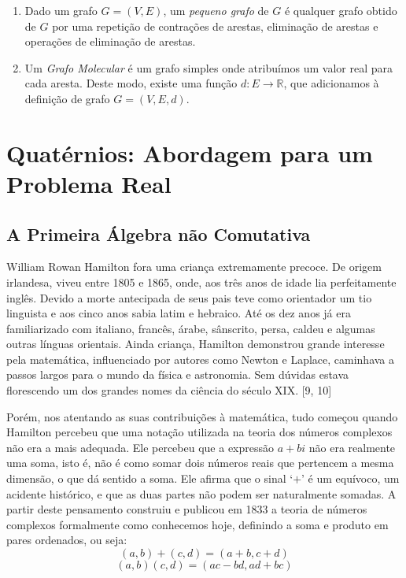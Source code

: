\documentclass[a4paper,12pt]{article}
\begin{document}
\begin{enumerate}
		\item Dado um grafo $G=(V,E)$, um \textit{pequeno grafo} de $G$ é qualquer grafo obtido de $G$ por uma repetição de contrações de arestas, eliminação de arestas e operações de eliminação de arestas.
		\item Um \textit{Grafo Molecular} é um grafo simples onde atribuímos um valor real para cada aresta. Deste modo, existe uma função $d:E\rightarrow \mathbb{R}$, que adicionamos à definição de grafo $G=(V,E,d)$.
	\end{enumerate}
	\newpage
	
	\section{Quatérnios: Abordagem para um Problema Real}
	
	\subsection{A Primeira Álgebra não Comutativa}
	William Rowan Hamilton fora uma criança extremamente precoce. De origem irlandesa, viveu entre 1805 e 1865, onde, aos três anos de idade lia perfeitamente inglês. Devido a morte antecipada de seus pais teve como orientador um tio linguista e aos cinco anos sabia latim e hebraico. Até os dez anos já era familiarizado com italiano, francês, árabe, sânscrito, persa, caldeu e algumas outras línguas orientais. Ainda criança, Hamilton demonstrou grande interesse pela matemática, influenciado por autores como Newton e Laplace, caminhava a passos largos para o mundo da física e astronomia. Sem dúvidas estava florescendo um dos grandes nomes da ciência do século XIX. [9, 10]
	
	Porém, nos atentando as suas contribuições à matemática, tudo começou quando Hamilton percebeu que uma notação utilizada na teoria dos números complexos não era a mais adequada. Ele percebeu que a expressão $a + bi$ não era realmente uma soma, isto é, não é como somar dois números reais que pertencem a mesma dimensão, o que dá sentido a soma. Ele afirma que o sinal ‘$+$’ é um equívoco, um acidente histórico, e que as duas partes não podem ser naturalmente somadas. A partir deste pensamento construiu e publicou em 1833 a teoria de números complexos formalmente como conhecemos hoje, definindo a soma e produto em pares ordenados, ou seja:
	\begin{equation*}
	(a,b) + (c,d) = (a + b, c + d)
	\end{equation*}
	\begin{equation*}
	(a, b)(c, d) = (ac-bd, ad + bc)
	\end{equation*}
	
\end{document}
